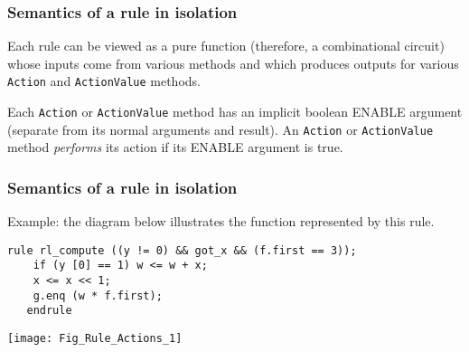 
\begin{frame}[fragile]
\frametitle{Semantics of a rule in isolation}

\footnotesize

Each rule can be viewed as a pure function (therefore, a combinational
circuit) whose inputs come from various methods and which produces
outputs for various {\tt Action} and {\tt ActionValue} methods.

\vspace{5ex}

Each {\tt Action} or {\tt ActionValue} method has an implicit boolean
ENABLE argument (separate from its normal arguments and result).  An
{\tt Action} or {\tt ActionValue} method
\emph{performs} its action if its ENABLE argument is true.

\end{frame}


\begin{frame}[fragile]
\frametitle{Semantics of a rule in isolation}

\label{isolated_rule_semantics}

\footnotesize

\begin{minipage}{0.35\textwidth}
Example: the diagram below illustrates the function represented by this rule.
\end{minipage}
\hm
\begin{minipage}{0.6\textwidth}
\begin{Verbatim}[frame=single]
   rule rl_compute ((y != 0) && got_x && (f.first == 3));
    if (y [0] == 1) w <= w + x;
    x <= x << 1;
    g.enq (w * f.first);
   endrule
\end{Verbatim}
\end{minipage}

\begin{center}
 \texttt{[image: Fig\_Rule\_Actions\_1]}
\end{center}

\end{frame}


